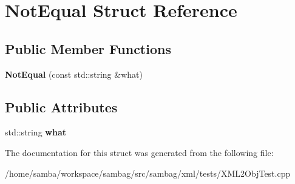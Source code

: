 \hypertarget{struct_not_equal}{
\section{NotEqual Struct Reference}
\label{struct_not_equal}
}
\subsection*{Public Member Functions}
\begin{DoxyCompactItemize}
\item 
\hypertarget{struct_not_equal_a71acb1cc5a8ebf8ce1c32cba0f6d9d10}{
{\bfseries NotEqual} (const std::string \&what)}
\label{struct_not_equal_a71acb1cc5a8ebf8ce1c32cba0f6d9d10}

\end{DoxyCompactItemize}
\subsection*{Public Attributes}
\begin{DoxyCompactItemize}
\item 
\hypertarget{struct_not_equal_a9d7ee077a6548cfb499c61f13f7fa777}{
std::string {\bfseries what}}
\label{struct_not_equal_a9d7ee077a6548cfb499c61f13f7fa777}

\end{DoxyCompactItemize}


The documentation for this struct was generated from the following file:\begin{DoxyCompactItemize}
\item 
/home/samba/workspace/sambag/src/sambag/xml/tests/XML2ObjTest.cpp\end{DoxyCompactItemize}
